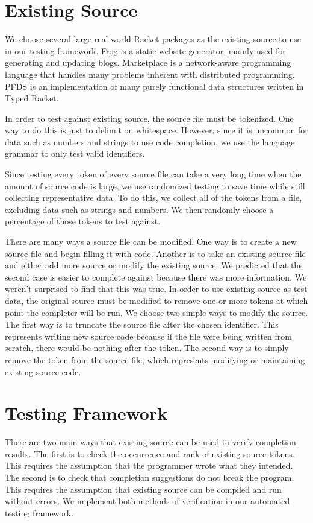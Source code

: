 \documentclass[ms,electronic,twosidetoc,letterpaper,chaptercenter,parttop,lol,lof,lot]{byumsphd}
\begin{document}
\section{Existing Source}

We choose several large real-world Racket packages as the existing source to use in our testing framework.
Frog is a static website generator, mainly used for generating and updating blogs.
Marketplace is a network-aware programming language that handles many problems inherent with distributed programming.
PFDS is an implementation of many purely functional data structures written in Typed Racket.

In order to test against existing source, the source file must be tokenized.
One way to do this is just to delimit on whitespace.
However, since it is uncommon for data such as numbers and strings to use code completion, we use the language grammar to only test valid identifiers.

Since testing every token of every source file can take a very long time when the amount of source code is large, we use randomized testing to save time while still collecting representative data.
To do this, we collect all of the tokens from a file, excluding data such as strings and numbers. 
We then randomly choose a percentage of those tokens to test against.

There are many ways a source file can be modified.
One way is to create a new source file and begin filling it with code.
Another is to take an existing source file and either add more source or modify the existing source.
We predicted that the second case is easier to complete against because there was more information.
We weren't surprised to find that this was true.
In order to use existing source as test data, the original source must be modified to remove one or more tokens at which point the completer will be run.
We choose two simple ways to modify the source.
The first way is to truncate the source file after the chosen identifier.
This represents writing new source code because if the file were being written from scratch, there would be nothing after the token.
The second way is to simply remove the token from the source file, which represents modifying or maintaining existing source code.

\section{Testing Framework}

There are two main ways that existing source can be used to verify completion results.
The first is to check the occurrence and rank of existing source tokens.
This requires the assumption that the programmer wrote what they intended.
The second is to check that completion suggestions do not break the program.
This requires the assumption that existing source can be compiled and run without errors.
We implement both methods of verification in our automated testing framework.
\end{document}
